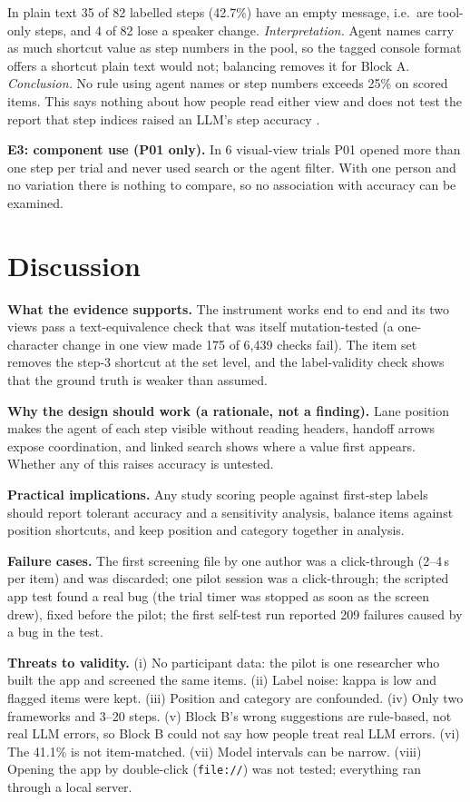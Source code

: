 \documentclass[conference]{IEEEtran}
\begin{document}
In plain text 35 of 82 labelled steps (42.7\%) have an empty message, i.e.\ are tool-only steps, and 4 of 82 lose a speaker change. \emph{Interpretation.} Agent names carry as much shortcut value as step numbers in the pool, so the tagged console format offers a shortcut plain text would not; balancing removes it for Block A. \emph{Conclusion.} No rule using agent names or step numbers exceeds 25\% on scored items. This says nothing about how people read either view and does not test the report that step indices raised an LLM's step accuracy \cite{ma2026dover}.

\textbf{E3: component use (P01 only).} In 6 visual-view trials P01 opened more than one step per trial and never used search or the agent filter. With one person and no variation there is nothing to compare, so no association with accuracy can be examined.

\section{Discussion}\label{sec:disc}
\textbf{What the evidence supports.} The instrument works end to end and its two views pass a text-equivalence check that was itself mutation-tested (a one-character change in one view made 175 of 6,439 checks fail). The item set removes the step-3 shortcut at the set level, and the label-validity check shows that the ground truth is weaker than assumed.

\textbf{Why the design should work (a rationale, not a finding).} Lane position makes the agent of each step visible without reading headers, handoff arrows expose coordination, and linked search shows where a value first appears. Whether any of this raises accuracy is untested.

\textbf{Practical implications.} Any study scoring people against first-step labels should report tolerant accuracy and a sensitivity analysis, balance items against position shortcuts, and keep position and category together in analysis.

\textbf{Failure cases.} The first screening file by one author was a click-through (2--4\,s per item) and was discarded; one pilot session was a click-through; the scripted app test found a real bug (the trial timer was stopped as soon as the screen drew), fixed before the pilot; the first self-test run reported 209 failures caused by a bug in the test.

\textbf{Threats to validity.} (i) No participant data: the pilot is one researcher who built the app and screened the same items. (ii) Label noise: kappa is low and flagged items were kept. (iii) Position and category are confounded. (iv) Only two frameworks and 3--20 steps. (v) Block B's wrong suggestions are rule-based, not real LLM errors, so Block B could not say how people treat real LLM errors. (vi) The 41.1\% is not item-matched. (vii) Model intervals can be narrow. (viii) Opening the app by double-click (\texttt{file://}) was not tested; everything ran through a local server.
\end{document}
